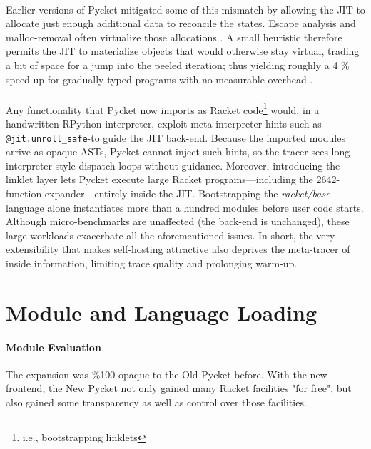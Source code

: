 	\paragraph{}%
		Earlier versions of Pycket mitigated some of this mismatch by allowing the JIT to allocate just enough additional data to reconcile the states. Escape analysis and malloc-removal often virtualize those allocations \cite{malloc-removal:11,loop-aware:12}. A small heuristic therefore permits the JIT to materialize objects that would otherwise stay virtual, trading a bit of space for a jump into the peeled iteration; thus yielding roughly a 4 \% speed-up for gradually typed programs with no measurable overhead \cite{pycketmain2}.

	\paragraph{}%
		Any functionality that Pycket now imports as Racket code\footnote{i.e., bootstrapping linklets} would, in a handwritten RPython interpreter, exploit meta-interpreter hints-such as \verb|@jit.unroll_safe|-to guide the JIT back-end. Because the imported modules arrive as opaque ASTs, Pycket cannot inject such hints, so the tracer sees long interpreter-style dispatch loops without guidance. Moreover, introducing the linklet layer lets Pycket execute large Racket programs—including the 2642-function expander—entirely inside the JIT. Bootstrapping the \emph{racket/base} language alone instantiates more than a hundred modules before user code starts. Although micro-benchmarks are unaffected (the back-end is unchanged), these large workloads exacerbate all the aforementioned issues. In short, the very extensibility that makes self-hosting attractive also deprives the meta-tracer of inside information, limiting trace quality and prolonging warm-up.

	\section{Module and Language Loading}
	\label{section:module-and-language-loading}

		\paragraph{Module Evaluation}%
		The expansion was \%100 opaque to the Old Pycket before. With the new frontend, the New Pycket not only gained many Racket facilities "for free", but also gained some transparency as well as control over those facilities.

